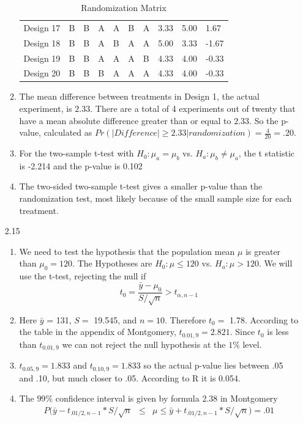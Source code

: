 \documentclass{article}
\begin{document}
\begin{enumerate}
\begin{enumerate}
\begin{table}[ht]
\begin{tabular}{r|lllllllll}
  Design 17 & B & B & A & A & B & A & 3.33 & 5.00 & 1.67 \\ 
  Design 18 & B & B & A & B & A & A & 5.00 & 3.33 & -1.67 \\ 
  Design 19 & B & B & A & A & A & B & 4.33 & 4.00 & -0.33 \\ 
  Design 20 & B & B & B & A & A & A & 4.33 & 4.00 & -0.33 \\ 
   \hline
\end{tabular}
\caption{Randomization Matrix}
\end{table}      \item The mean difference between treatments in Design 1, the actual experiment, is $2.33$. There are a total of 4 experiments out of twenty that have a mean absolute difference greater than or equal to $2.33$. So the p-value, calculated as $Pr(|Difference| \ge 2.33 | randomization) = \frac{4}{20} = .20$.
      \item For the two-sample t-test with $H_0: \mu_a = \mu_b$ vs. $H_a: \mu_b \ne \mu_a$, the t statistic is -2.214 and the p-value is 0.102
      \item The two-sided two-sample t-test gives a smaller p-value than the randomization test, most likely because of the small sample size for each treatment.
    \end{enumerate}
  \item[2.15]
    \begin{enumerate}
      \item We need to test the hypothesis that the population mean $\mu$ is greater than $\mu_0 = 120$. The Hypotheses are $H_0: \mu \le 120$ vs. $H_a: \mu > 120$. We will use the t-test, rejecting the null if
          $$t_0 = \frac{\bar{y} - \mu_0}{S/\sqrt{n}} > t_{\alpha,n-1}$$
      \item Here $\bar{y}$ = 131, $S =$ 19.545, and $n=10$. Therefore $t_0 =$ 1.78. According to the table in the appendix of Montgomery, $t_{0.01,9} = 2.821$. Since $t_0$ is less than $t_{0.01,9}$ we can not reject the null hypothesis at the $1\%$ level.
      \item $t_{0.05,9} = 1.833$ and $t_{0.10,9} = 1.833$ so the actual p-value lies between .05 and .10, but much closer to .05. According to R it is 0.054.
      \item The $99\%$ confidence interval is given by formula 2.38 in Montgomery
        $$\begin{array}{rcl}P(\bar{y} - t_{.01/2,n-1}*S/\sqrt{n} &\le& \mu \le \bar{y} + t_{.01/2,n-1}*S/\sqrt{n}) = .01 \\

\end{array}$$
\end{enumerate}
\end{enumerate}
\end{document}

